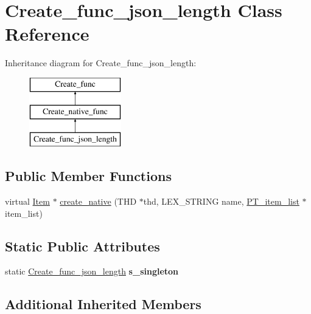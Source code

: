 \hypertarget{classCreate__func__json__length}{}\section{Create\+\_\+func\+\_\+json\+\_\+length Class Reference}
\label{classCreate__func__json__length}
Inheritance diagram for Create\+\_\+func\+\_\+json\+\_\+length\+:\begin{figure}[H]
\begin{center}
\leavevmode
\includegraphics[height=3.000000cm]{classCreate__func__json__length}
\end{center}
\end{figure}
\subsection*{Public Member Functions}
\begin{DoxyCompactItemize}
\item 
virtual \mbox{\hyperlink{classItem}{Item}} $\ast$ \mbox{\hyperlink{classCreate__func__json__length_a2f1cf5a8bea82cf9108d83b80d628fe8}{create\+\_\+native}} (T\+HD $\ast$thd, L\+E\+X\+\_\+\+S\+T\+R\+I\+NG name, \mbox{\hyperlink{classPT__item__list}{P\+T\+\_\+item\+\_\+list}} $\ast$item\+\_\+list)
\end{DoxyCompactItemize}
\subsection*{Static Public Attributes}
\begin{DoxyCompactItemize}
\item 
\mbox{\label{classCreate__func__json__length_a5b3eb6b48aefb2d190a24475cb267598}} 
static \mbox{\hyperlink{classCreate__func__json__length}{Create\+\_\+func\+\_\+json\+\_\+length}} {\bfseries s\+\_\+singleton}
\end{DoxyCompactItemize}
\subsection*{Additional Inherited Members}


